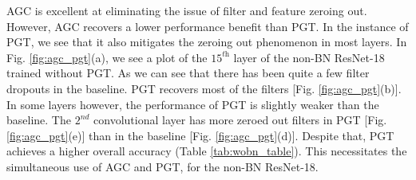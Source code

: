 \documentclass[times,sort&compress]{elsarticle}
\begin{document}
AGC is excellent at eliminating the issue of filter and feature zeroing out. However,
AGC recovers a lower performance benefit than PGT. In the instance of PGT, we see that
it also mitigates the zeroing out phenomenon in most layers. In Fig.
\ref{fig:agc_pgt}(a), we see a plot of the $15^\textit{th}$ layer of the non-BN
ResNet-18 trained without PGT. As we can see that there has been quite a few filter
dropouts in the baseline. PGT recovers most of the filters [Fig. \ref{fig:agc_pgt}(b)].
In some layers however, the performance of PGT is slightly weaker than the baseline. The
$2^\textit{nd}$ convolutional layer has more zeroed out filters in PGT [Fig.
\ref{fig:agc_pgt}(e)] than in the baseline [Fig. \ref{fig:agc_pgt}(d)]. Despite that,
PGT achieves a higher overall accuracy (Table \ref{tab:wobn_table}). This necessitates
the simultaneous use of AGC and PGT, for the non-BN ResNet-18.
\end{document}

